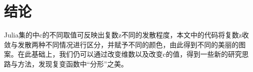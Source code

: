 \documentclass[UTF8,a4paper]{ctexart}
\begin{document}
	\section{结论}
	Julia集的中c的不同取值可反映出复数z不同的发散程度，本文中的代码将复数z收敛与发散两种不同情况进行区分，并赋予不同的颜色，由此得到不同的美丽的图案。在此基础上，我们仍可以通过改变维数以及改变c的值，得到一些新的研究思路与方法，发现复变函数中“分形”之美。
	
	
	
\end{document}
